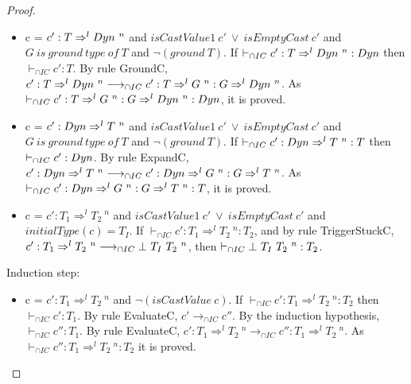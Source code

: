 \documentclass[a4paper]{article}
\begin{document}
\begin{proof}
\begin{itemize}
    \item c = $c' : T \Rightarrow^l \Dyn\ ^n$ and $isCastValue1\ c'\ \lor\ isEmptyCast\ c'$ and $G\ is\ ground\ type\ of\ T$ and $\neg(ground\ T)$.
    If $\vdash_{\cap IC} c' : T \Rightarrow^l Dyn\ ^n : Dyn$ then $\vdash_{\cap IC} c' : T$.
    By rule GroundC, $c' : T \Rightarrow^l \Dyn\ ^n \longrightarrow_{\cap IC} c' : T \Rightarrow^l G\ ^n : G \Rightarrow^l \Dyn\ ^n$.
    As $\vdash_{\cap IC} c' : T \Rightarrow^l G\ ^n : G \Rightarrow^l Dyn\ ^n : Dyn$, it is proved.
    \item c = $c' : \Dyn \Rightarrow^l T\ ^n$ and $isCastValue1\ c'\ \lor\ isEmptyCast\ c'$ and $G\ is\ ground\ type\ of\ T$ and $\neg(ground\ T)$.
    If $\vdash_{\cap IC} c' : Dyn \Rightarrow^l T\ ^n : T$ then $\vdash_{\cap IC} c' : Dyn$.
    By rule ExpandC, $c' : \Dyn \Rightarrow^l T\ ^n \longrightarrow_{\cap IC} c' : \Dyn \Rightarrow^l G\ ^n : G \Rightarrow^l T\ ^n$.
    As $\vdash_{\cap IC} c' : Dyn \Rightarrow^l G\ ^n : G \Rightarrow^l T\ ^n : T$, it is proved.
    \item c = $c' : T_1 \Rightarrow^l T_2\ ^n$ and $isCastValue1\ c'\ \lor\ isEmptyCast\ c'$ and $initialType(c) = T_I$.
    If $\vdash_{\cap IC} c' : T_1 \Rightarrow^l T_2\ ^n : T_2$, and by rule TriggerStuckC, $c' : T_1 \Rightarrow^l T_2\ ^n \longrightarrow_{\cap IC} \bot\ T_I\ T_2\ ^{n}$, then $\vdash_{\cap IC} \bot\ T_I\ T_2\ ^{n} : T_2$.
\end{itemize}
Induction step:
\begin{itemize}
    \item c = $c' : T_1 \Rightarrow^l T_2\ ^n$ and $\neg(isCastValue\ c)$.
    If $\vdash_{\cap IC} c' : T_1 \Rightarrow^l T_2\ ^n : T_2$ then $\vdash_{\cap IC} c' : T_1$.
    By rule EvaluateC, $c' \longrightarrow_{\cap IC} c''$.
    By the induction hypothesis, $\vdash_{\cap IC} c'' : T_1$.
    By rule EvaluateC, $c' : T_1 \Rightarrow^l T_2\ ^n \longrightarrow_{\cap IC} c'' : T_1 \Rightarrow^l T_2\ ^n$.
    As $\vdash_{\cap IC} c'' : T_1 \Rightarrow^l T_2\ ^n : T_2$ it is proved.
\end{itemize}
\end{proof}
\end{document}
